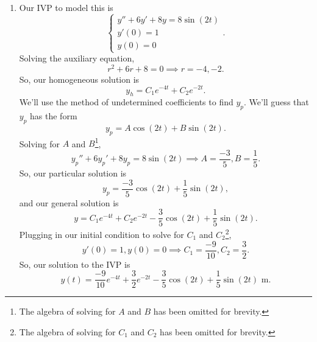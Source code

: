 \begin{enumerate}[label=\arabic*.]
			\begin{enumerate}[label=(\alph*)]
				\item
					Our IVP to model this is
					\begin{equation*}
						\begin{cases}
							y'' + 6y' + 8y = 8\sin{(2t)} \\
							y'(0) = 1 \\
							y(0) = 0
						\end{cases}.
					\end{equation*}
					Solving the auxiliary equation,
					\begin{equation*}
						r^2 + 6r + 8 = 0 \implies r = -4, -2.
					\end{equation*}
					So, our homogeneous solution is
					\begin{equation*}
						y_h = C_1e^{-4t} + C_2e^{-2t}.
					\end{equation*}
					We'll use the method of undetermined coefficients to find $y_p$.
					We'll guess that $y_p$ has the form
					\begin{equation*}
						y_p = A\cos{(2t)} + B\sin{(2t)}.
					\end{equation*}
					Solving for $A$ and $B$\footnote{The algebra of solving for $A$ and $B$ has been omitted for brevity.},
					\begin{equation*}
						y_p'' + 6y_p' + 8y_p = 8\sin{(2t)} \implies A = \frac{-3}{5}, B = \frac{1}{5}.
					\end{equation*}
					So, our particular solution is
					\begin{equation*}
						y_p = \frac{-3}{5}\cos{(2t)} + \frac{1}{5}\sin{(2t)},
					\end{equation*}
					and our general solution is
					\begin{equation*}
						y = C_1e^{-4t} + C_2e^{-2t} - \frac{3}{5}\cos{(2t)} + \frac{1}{5}\sin{(2t)}.
					\end{equation*}
					Plugging in our initial condition to solve for $C_1$ and $C_2$\footnote{The algebra of solving for $C_1$ and $C_2$ has been omitted for brevity.},
					\begin{equation*}
						y'(0) = 1, y(0) = 0 \implies C_1 = \frac{-9}{10}, C_2 = \frac{3}{2}.
					\end{equation*}
					So, our solution to the IVP is
					\begin{equation*}
						y(t) = \frac{-9}{10}e^{-4t} + \frac{3}{2}e^{-2t} - \frac{3}{5}\cos{(2t)} + \frac{1}{5}\sin{(2t)} \text{ m}.
					\end{equation*}

\end{enumerate}
\end{enumerate}
